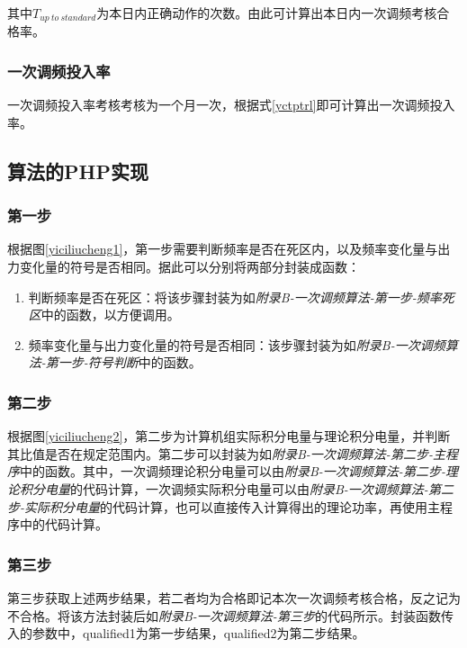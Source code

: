 \documentclass[winfonts,UTF8,a4paper]{ctexart}
\begin{document}
其中$ T_{up\ to\ standard} $为本日内正确动作的次数。由此可计算出本日内一次调频考核合格率。


\subsubsection{一次调频投入率}
一次调频投入率考核考核为一个月一次，根据式\ref{yctptrl}即可计算出一次调频投入率。

\subsection{算法的PHP实现}
\subsubsection{第一步}
根据图\ref{yiciliucheng1}，第一步需要判断频率是否在死区内，以及频率变化量与出力变化量的符号是否相同。据此可以分别将两部分封装成函数：

\begin{enumerate}
	\item 判断频率是否在死区：将该步骤封装为如\textit{附录B-一次调频算法-第一步-频率死区}中的函数，以方便调用。
	
	\item 频率变化量与出力变化量的符号是否相同：该步骤封装为如\textit{附录B-一次调频算法-第一步-符号判断}中的函数。
\end{enumerate}

\subsubsection{第二步}

根据图\ref{yiciliucheng2}，第二步为计算机组实际积分电量与理论积分电量，并判断其比值是否在规定范围内。第二步可以封装为如\textit{附录B-一次调频算法-第二步-主程序}中的函数。其中，一次调频理论积分电量可以由\textit{附录B-一次调频算法-第二步-理论积分电量}的代码计算，一次调频实际积分电量可以由\textit{附录B-一次调频算法-第二步-实际积分电量}的代码计算，也可以直接传入计算得出的理论功率，再使用主程序中的代码计算。

\subsubsection{第三步}
第三步获取上述两步结果，若二者均为合格即记本次一次调频考核合格，反之记为不合格。将该方法封装后如\textit{附录B-一次调频算法-第三步}的代码所示。封装函数传入的参数中，qualified1为第一步结果，qualified2为第二步结果。
\end{document}
